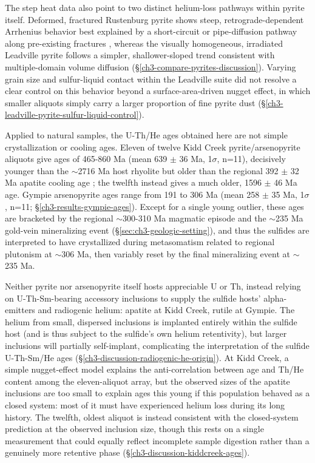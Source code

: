 The step heat data also point to two distinct helium-loss pathways
within pyrite itself. Deformed, fractured Rustenburg pyrite shows steep,
retrograde-dependent Arrhenius behavior best explained by a
short-circuit or pipe-diffusion pathway along pre-existing fractures
\citep{lee1992}, whereas the visually homogeneous, irradiated Leadville
pyrite follows a simpler, shallower-sloped trend consistent with multiple-domain volume
diffusion (\S\ref{ch3-compare-pyrites-discussion}). Varying grain size
and sulfur-liquid contact within the Leadville suite did not resolve a
clear control on this behavior beyond a surface-area-driven nugget
effect, in which smaller aliquots simply carry a larger proportion 
of fine pyrite dust (\S\ref{ch3-leadville-pyrite-sulfur-liquid-control}).

Applied to natural samples, the U-Th/He ages obtained here are not
simple crystallization or cooling ages. Eleven of twelve Kidd Creek
pyrite/arsenopyrite aliquots give ages of 465-860 Ma (mean 639 $\pm$ 36
Ma, 1$\sigma$, n=11), decisively younger than the $\sim$2716 Ma host
rhyolite \citep{hannington1999} but older than the regional 392 $\pm$ 32
Ma apatite cooling age \citep{sturrock2024}; the twelfth instead gives a
much older, 1596 $\pm$ 46 Ma age. Gympie
arsenopyrite ages range from 191 to 306 Ma (mean 258 $\pm$ 35 Ma, 1$\sigma$,
n=11; \S\ref{ch3-results-gympie-ages}). Except for a single young outlier, these ages are bracketed by the regional
$\sim$300-310 Ma magmatic episode and the $\sim$235 Ma gold-vein
mineralizing event (\S\ref{sec:ch3-geologic-setting}), and thus the sulfides are interpreted 
to have crystallized during metasomatism related to regional plutonism at $\sim$306 Ma, then variably reset by the 
final mineralizing event at $\sim$235 Ma. 

Neither pyrite nor arsenopyrite itself hosts appreciable U or Th, instead relying on
U-Th-Sm-bearing accessory inclusions to supply the sulfide hosts'
alpha-emitters and radiogenic helium: apatite at Kidd Creek, rutile at
Gympie. The helium from small, dispersed inclusions is implanted
entirely within the sulfide host (and is thus subject to the sulfide's
own helium retentivity), but larger inclusions will partially
self-implant, complicating the interpretation of the sulfide U-Th-Sm/He ages
(\S\ref{ch3-discussion-radiogenic-he-origin}). At Kidd Creek, a simple
nugget-effect model explains the anti-correlation between age and Th/He
content among the eleven-aliquot array, but the observed sizes of the
apatite inclusions are too small to explain ages this young if this
population behaved as a closed system: most of it must have experienced
helium loss during its long history. The twelfth, oldest aliquot is
instead consistent with the closed-system prediction at the observed
inclusion size, though this rests on a single measurement that could
equally reflect incomplete sample digestion rather than a genuinely more
retentive phase (\S\ref{ch3-discussion-kiddcreek-ages}).

